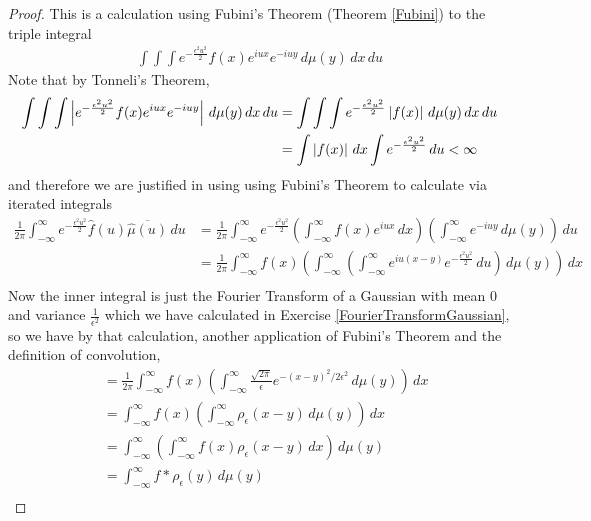 \begin{proof}
This is a calculation using Fubini's Theorem (Theorem \ref{Fubini}) to
the triple integral
\begin{align*}
\int \int \int e^{-\frac{\epsilon^2 u^2}{2}} f(x) e^{iux} e^{-iuy}
\, d\mu(y) \, dx \, du
\end{align*}
Note that by Tonneli's Theorem, 
\begin{align*}
\int \int \int \left \vert  e^{-\frac{\epsilon^2 u^2}{2}} f(x) e^{iux} e^{-iuy} \right \vert
\, d\mu(y) \, dx \, du &= \int \int \int e^{-\frac{\epsilon^2 u^2}{2}} \left \vert  f(x) \right \vert 
\, d\mu(y) \, dx \, du \\
&=\int \left \vert  f(x) \right \vert  \, dx \int e^{-\frac{\epsilon^2 u^2}{2}} \, du < \infty
\end{align*}
and therefore we are justified in using using Fubini's Theorem to
calculate via iterated integrals
\begin{align*}
 \frac{1}{2 \pi} \int_{-\infty}^\infty e^{-\frac{\epsilon^2 u^2}{2}} \hat{f}(u)
 \overline{\hat{\mu}(u)}\, du &=  \frac{1}{2 \pi} \int_{-\infty}^\infty
 e^{-\frac{\epsilon^2 u^2}{2}} \left( \int_{-\infty}^\infty f(x)e^{iux} \, dx \right )
 \left (\int_{-\infty}^\infty e^{-iuy} \, d\mu(y) \right )\, du \\
&=  \frac{1}{2 \pi} \int_{-\infty}^\infty f(x)
\left( \int_{-\infty}^\infty 
 \left (\int_{-\infty}^\infty e^{iu(x-y)}  e^{-\frac{\epsilon^2 u^2}{2}}
   \, du \right ) \, d\mu(y) \right ) \, dx\\
\end{align*}
Now the inner integral is just the Fourier Transform of a Gaussian
with mean $0$ and variance $\frac{1}{\epsilon^2}$ which we have calculated in Exercise \ref {FourierTransformGaussian},
so we have by that calculation, another application of Fubini's
Theorem and the definition of convolution,
\begin{align*}
&= \frac{1}{2 \pi} \int_{-\infty}^\infty f(x)
\left( \int_{-\infty}^\infty \frac{\sqrt{2\pi}}{\epsilon}
  e^{-(x-y)^2/2\epsilon^2} \, d\mu(y) \right ) \, dx\\
&= \int_{-\infty}^\infty f(x)
\left( \int_{-\infty}^\infty \rho_\epsilon(x -y) \, d\mu(y) \right ) \, dx\\
&= \int_{-\infty}^\infty 
\left( \int_{-\infty}^\infty f(x) \rho_\epsilon(x -y) \, dx \right )
\, d\mu(y) \\
&= \int_{-\infty}^\infty f * \rho_\epsilon(y) \, d\mu(y) \\
\end{align*}


\end{proof}

